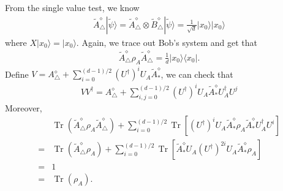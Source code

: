 \documentclass[11pt,letterpaper]{article}
\newcommand{\ket}[1]{|#1\rangle}
\newcommand{\ketbra}[2]{|#1\rangle\langle#2|}
\newcommand{\x}{\otimes}
\DeclareMathOperator{\Tr}{Tr}
\newcommand{\1}{\mathbb{1}}
\newcommand{\tA}{\tilde{A}}
\newcommand{\tB}{\tilde{B}}
\newcommand{\tpsi}{\tilde{\psi}}
\theoremstyle{definition}
\begin{document}
From the single value test, we know 
\begin{align}
	\tA_\triangle^\diamond \ket{\tpsi} = \tA_\triangle^\diamond \x \tB_\triangle^\diamond \ket{\tpsi} = \frac{1}{\sqrt{d}}
	\ket{x_0}\ket{x_0}
\end{align}
where $X \ket{x_0} = \ket{x_0}$.
Again, we trace out Bob's system and get that
\begin{align}
	\tA_\triangle^\diamond \rho_A \tA_\triangle^\diamond = \frac{1}{d} \ketbra{x_0}{x_0}.
\end{align}
Define $V = A_\triangle^\diamond + \sum_{i=0}^{(d-1)/2} (U^\dagger)^i U_A \tA_\ast^\diamond$, we can check that 
\begin{align}
	V V^\dagger =A_\triangle^\diamond  + \sum_{i,j=0}^{(d-1)/2} (U^\dagger)^i U_A \tA_\ast^\diamond U_A^\dagger U^j
\end{align}
Moreover, 
\begin{align}
	&\Tr(\tA_\triangle^\diamond \rho_A \tA_\triangle^\diamond) + \sum_{i=0}^{(d-1)/2} \Tr[(U^\dagger)^i U_A \tA_\ast^\diamond \rho_A \tA_\ast^\diamond U_A^\dagger U^i] \\
	=& \Tr(\tA_\triangle^\diamond \rho_A) + \sum_{i=0}^{(d-1)/2} \Tr[  \tA_\ast^\diamond U_A (U^\dagger)^{2i} U_A\tA_\ast^\diamond \rho_A] \\
	=&1 \\
	=& \Tr(\rho_A).
\end{align}
\end{document}
